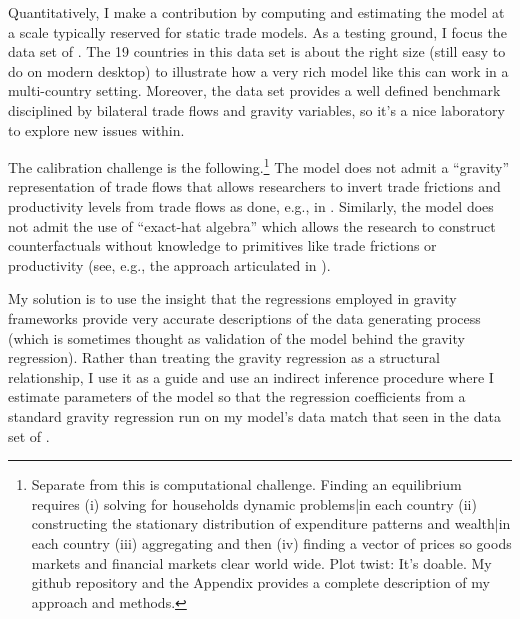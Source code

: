 \documentclass[12pt,pdftex]{article}
\begin{document}
\begin{onehalfspacing}
Quantitatively, I make a contribution by computing and estimating the model at a scale typically reserved for static trade models. As a testing ground, I focus the data set of \citet{eaton2002technology}. The 19 countries in this data set is about the right size (still easy to do on modern desktop) to illustrate how a very rich model like this can work in a multi-country setting. Moreover, the \citet{eaton2002technology} data set provides a well defined benchmark disciplined by bilateral trade flows and gravity variables, so it's a nice laboratory to explore new issues within.

The calibration challenge is the following.\footnote{Separate from this is computational challenge. Finding an equilibrium requires (i) solving for households dynamic problems|in each country (ii) constructing the stationary distribution of expenditure patterns and wealth|in each country (iii) aggregating and then (iv) finding a vector of prices so goods markets and financial markets clear world wide. Plot twist: It's doable. My github repository and the Appendix provides a complete description of my approach and methods.} The model does not admit a ``gravity'' representation of trade flows that allows researchers to invert trade frictions and productivity levels from trade flows as done, e.g., in \citet{eaton2002technology}. Similarly, the model does not admit the use of ``exact-hat algebra'' which allows the research to construct counterfactuals without knowledge to primitives like trade frictions or productivity (see, e.g., the approach articulated in \citet{costinot2014trade}).

My solution is to use the insight that the regressions employed in gravity frameworks provide very accurate descriptions of the data generating process (which is sometimes thought as validation of the model behind the gravity regression). Rather than treating the gravity regression as a structural relationship, I use it as a guide and use an indirect inference procedure where I estimate parameters of the model so that the regression coefficients from a standard gravity regression run on my model's data match that seen in the data set of \citet{eaton2002technology}.





\end{onehalfspacing}
\end{document}
